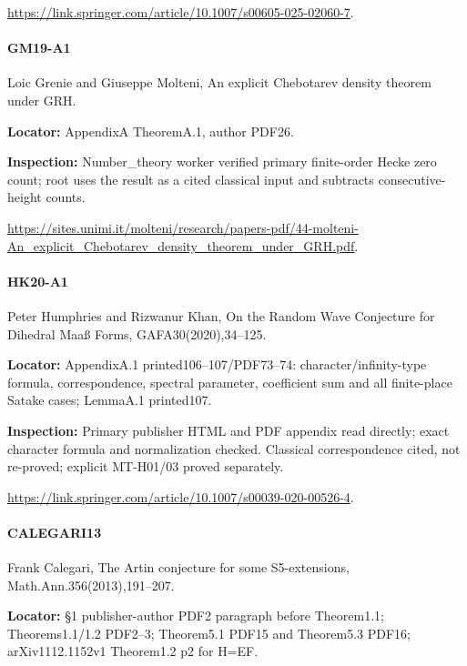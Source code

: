 \documentclass[11pt,a4paper]{article}
\begin{document}
\url{https://link.springer.com/article/10.1007/s00605-025-02060-7}.

\paragraph{GM19-A1} Loic Grenie and Giuseppe Molteni, An explicit Chebotarev density theorem under GRH.

\textbf{Locator:} AppendixA TheoremA.\allowbreak{}1, author PDF26.

\textbf{Inspection:} Number\_\allowbreak{}theory worker verified primary finite-order Hecke zero count; root uses the result as a cited classical input and subtracts consecutive-height counts.\allowbreak{}

\url{https://sites.unimi.it/molteni/research/papers-pdf/44-molteni-An_explicit_Chebotarev_density_theorem_under_GRH.pdf}.

\paragraph{HK20-A1} Peter Humphries and Rizwanur Khan, On the Random Wave Conjecture for Dihedral Maaß Forms, GAFA30(2020),34–\allowbreak{}125.

\textbf{Locator:} AppendixA.\allowbreak{}1 printed106–\allowbreak{}107/\allowbreak{}PDF73–\allowbreak{}74:\allowbreak{} character/\allowbreak{}infinity-type formula, correspondence, spectral parameter, coefficient sum and all finite-place Satake cases; LemmaA.\allowbreak{}1 printed107.

\textbf{Inspection:} Primary publisher HTML and PDF appendix read directly; exact character formula and normalization checked.\allowbreak{} Classical correspondence cited, not re-proved; explicit MT-H01/\allowbreak{}03 proved separately.\allowbreak{}

\url{https://link.springer.com/article/10.1007/s00039-020-00526-4}.

\paragraph{CALEGARI13} Frank Calegari, The Artin conjecture for some S5-extensions, Math.\allowbreak{}Ann.\allowbreak{}356(2013),191–\allowbreak{}207.

\textbf{Locator:} §1 publisher-author PDF2 paragraph before Theorem1.\allowbreak{}1; Theorems1.\allowbreak{}1/\allowbreak{}1.\allowbreak{}2 PDF2–\allowbreak{}3; Theorem5.\allowbreak{}1 PDF15 and Theorem5.\allowbreak{}3 PDF16; arXiv1112.\allowbreak{}1152v1 Theorem1.\allowbreak{}2 p2 for H=EF.
\end{document}
